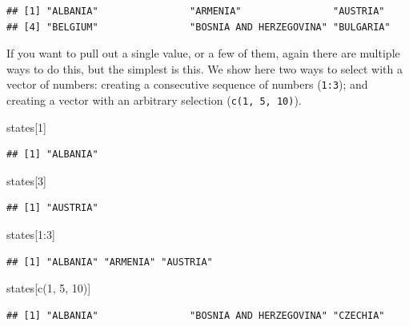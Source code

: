 \documentclass[
]{book}
\newenvironment{Shaded}{\begin{snugshade}}{\end{snugshade}}
\newcommand{\DecValTok}[1]{\textcolor[rgb]{0.00,0.00,0.81}{#1}}
\newcommand{\FunctionTok}[1]{\textcolor[rgb]{0.00,0.00,0.00}{#1}}
\newcommand{\NormalTok}[1]{#1}
\newcommand{\SpecialCharTok}[1]{\textcolor[rgb]{0.00,0.00,0.00}{#1}}
\begin{document}
\begin{verbatim}
## [1] "ALBANIA"                "ARMENIA"                "AUSTRIA"               
## [4] "BELGIUM"                "BOSNIA AND HERZEGOVINA" "BULGARIA"
\end{verbatim}

If you want to pull out a single value, or a few of them, again there are multiple ways to do this, but the simplest is this. We show here two ways to select with a vector of numbers: creating a consecutive sequence of numbers (\texttt{1:3}); and creating a vector with an arbitrary selection (\texttt{c(1,\ 5,\ 10)}).

\begin{Shaded}
\begin{Highlighting}[]
\NormalTok{states[}\DecValTok{1}\NormalTok{]}
\end{Highlighting}
\end{Shaded}

\begin{verbatim}
## [1] "ALBANIA"
\end{verbatim}

\begin{Shaded}
\begin{Highlighting}[]
\NormalTok{states[}\DecValTok{3}\NormalTok{]}
\end{Highlighting}
\end{Shaded}

\begin{verbatim}
## [1] "AUSTRIA"
\end{verbatim}

\begin{Shaded}
\begin{Highlighting}[]
\NormalTok{states[}\DecValTok{1}\SpecialCharTok{:}\DecValTok{3}\NormalTok{]}
\end{Highlighting}
\end{Shaded}

\begin{verbatim}
## [1] "ALBANIA" "ARMENIA" "AUSTRIA"
\end{verbatim}

\begin{Shaded}
\begin{Highlighting}[]
\NormalTok{states[}\FunctionTok{c}\NormalTok{(}\DecValTok{1}\NormalTok{, }\DecValTok{5}\NormalTok{, }\DecValTok{10}\NormalTok{)]}
\end{Highlighting}
\end{Shaded}

\begin{verbatim}
## [1] "ALBANIA"                "BOSNIA AND HERZEGOVINA" "CZECHIA"
\end{verbatim}
\end{document}
